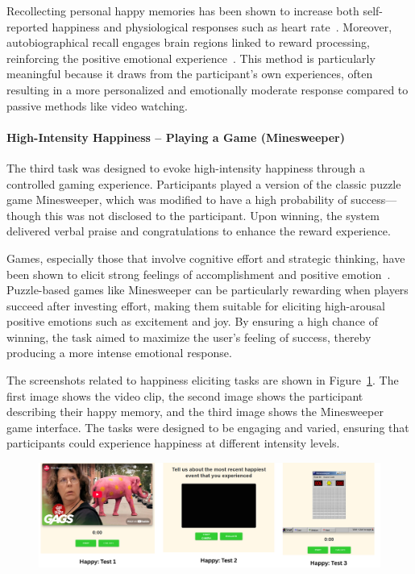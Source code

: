 Recollecting personal happy memories has been shown to increase both self-reported happiness and physiological responses such as heart rate~\citep{emotionElictingsiedlecka2019}. Moreover, autobiographical recall engages brain regions linked to reward processing, reinforcing the positive emotional experience~\citep{speer2017reminiscing}. This method is particularly meaningful because it draws from the participant’s own experiences, often resulting in a more personalized and emotionally moderate response compared to passive methods like video watching.

\paragraph*{High-Intensity Happiness – Playing a Game (Minesweeper)}

The third task was designed to evoke high-intensity happiness through a controlled gaming experience. Participants played a version of the classic puzzle game Minesweeper, which was modified to have a high probability of success—though this was not disclosed to the participant. Upon winning, the system delivered verbal praise and congratulations to enhance the reward experience.

Games, especially those that involve cognitive effort and strategic thinking, have been shown to elicit strong feelings of accomplishment and positive emotion~\citep{jones2014gaming}. Puzzle-based games like Minesweeper can be particularly rewarding when players succeed after investing effort, making them suitable for eliciting high-arousal positive emotions such as excitement and joy. By ensuring a high chance of winning, the task aimed to maximize the user’s feeling of success, thereby producing a more intense emotional response.

The screenshots related to happiness eliciting tasks are shown in Figure~\ref{fig:task-happy}. The first image shows the video clip, the second image shows the participant describing their happy memory, and the third image shows the Minesweeper game interface. The tasks were designed to be engaging and varied, ensuring that participants could experience happiness at different intensity levels.

\begin{figure}[h]
    \centering
    \includegraphics[width=1\textwidth]{img/chapter_03/happy_tests.png}
    \label{fig:task-happy}
\end{figure}